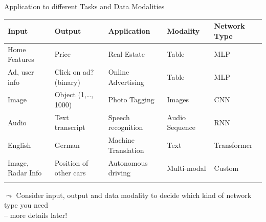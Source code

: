 \documentclass[aspectratio=169]{../latex_main/tntbeamer}  %
\begin{document}
  	\begin{frame}{Application to different Tasks and Data Modalities}

        {\centering
        \begin{tabular}{lllll}
             Input & Output & Application & Modality & Network Type  \\
             \midrule
             Home Features & Price & Real Estate & Table & MLP \\ \pause
             Ad, user info & Click on ad? (binary) & Online Advertising & Table & MLP\\ \pause
             Image & Object (1,\ldots, 1000) & Photo Tagging & Images & CNN\\ \pause
             Audio & Text transcript & Speech recognition & Audio Sequence & RNN\\ \pause
             English & German & Machine Translation & Text & Transformer\\ \pause
             Image, Radar Info & Position of other cars & Autonomous driving & Multi-modal & Custom\\ \pause
        \end{tabular}}

        \vspace{2em}

        $\leadsto$ Consider input, output and data modality to decide which kind of network type you need\\ -- more details later!

	\end{frame}
	
\end{document}
